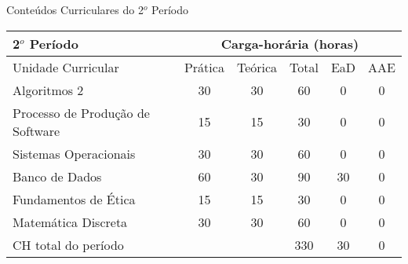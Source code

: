 \begin{quadro}[ht!]
\centering
\caption{Conteúdos Curriculares do 2$^o$ Período}\label{qua:periodo2}
\begin{tabular}{|p{8.0cm}|c|c|c|c|c|}
\hline
\rowcolor{blue1} 2$^o$ Período & \multicolumn{5}{|c|}{\centering Carga-horária (horas)} \\ \hline
\rowcolor{blue1} Unidade Curricular & Prática & Teórica & Total & EaD & AAE \\ \hline
Algoritmos 2 & 30 & 30 & 60 & 0	&	0 \\	\hline
Processo de Produção de Software & 15 & 15 & 30 & 0	&	0 \\	\hline
Sistemas Operacionais & 30 & 30 & 60 & 0	&	0 \\	\hline
Banco de Dados & 60 & 30 & 90 & 30	&	0 \\	\hline
Fundamentos de Ética & 15 & 15 & 30 & 0	&	0 \\	\hline
Matemática Discreta & 30 & 30 & 60 & 0	&	0 \\	\hline
CH total do período & \multicolumn{2}{p{3.3cm}|}{\cellcolor{blue1}} & 330 & 30	&	0 \\ \hline
 \end{tabular} \end{quadro}